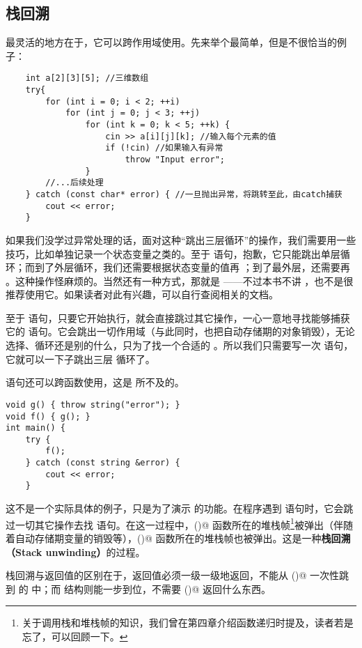 \subsection*{栈回溯}
\lstinline@throw@ 最灵活的地方在于，它可以跨作用域使用。先来举个最简单，但是不很恰当的例子：
\begin{lstlisting}
    int a[2][3][5]; //三维数组
    try{
        for (int i = 0; i < 2; ++i)
            for (int j = 0; j < 3; ++j)
                for (int k = 0; k < 5; ++k) {
                    cin >> a[i][j][k]; //输入每个元素的值
                    if (!cin) //如果输入有异常
                        throw "Input error";
                }
        //...后续处理
    } catch (const char* error) { //一旦抛出异常，将跳转至此，由catch捕获
        cout << error;
    }
\end{lstlisting}
如果我们没学过异常处理的话，面对这种``跳出三层循环''的操作，我们需要用一些技巧，比如单独记录一个状态变量之类的。至于 \lstinline@break@ 语句，抱歉，它只能跳出单层循环；而到了外层循环，我们还需要根据状态变量的值再 \lstinline@break@；到了最外层，还需要再 \lstinline@break@。这种操作怪麻烦的。当然还有一种方式，那就是 \lstinline@goto@——不过本书不讲 \lstinline@goto@，也不是很推荐使用它。如果读者对此有兴趣，可以自行查阅相关的文档。\par
至于 \lstinline@throw@ 语句，只要它开始执行，就会直接跳过其它操作，一心一意地寻找能够捕获它的 \lstinline@catch@ 语句。它会跳出一切作用域（与此同时，也把自动存储期的对象销毁），无论选择、循环还是别的什么，只为了找一个合适的 \lstinline@catch@。所以我们只需要写一次 \lstinline@throw@ 语句，它就可以一下子跳出三层 \lstinline@for@ 循环了。\par
\lstinline@throw@ 语句还可以跨函数使用，这是 \lstinline@break@ 所不及的。
\begin{lstlisting}
void g() { throw string("error"); }
void f() { g(); }
int main() {
    try {
        f();
    } catch (const string &error) {
        cout << error;
    }
\end{lstlisting}
这不是一个实际具体的例子，只是为了演示 \lstinline@throw@ 的功能。在程序遇到 \lstinline@throw@ 语句时，它会跳过一切其它操作去找 \lstinline@catch@ 语句。在这一过程中，\lstinline@g()@ 函数所在的堆栈帧\footnote{关于调用栈和堆栈帧的知识，我们曾在第四章介绍函数递归时提及，读者若是忘了，可以回顾一下。}被弹出（伴随着自动存储期变量的销毁等），\lstinline@f()@ 函数所在的堆栈帧也被弹出。这是一种\textbf{栈回溯（Stack unwinding）}的过程。\par
栈回溯与返回值的区别在于，返回值必须一级一级地返回，不能从 \lstinline@g()@ 一次性跳到 \lstinline@main@ 的 \lstinline@catch@ 中；而 \lstinline@throw@ 结构则能一步到位，不需要 \lstinline@f()@ 返回什么东西。\par
